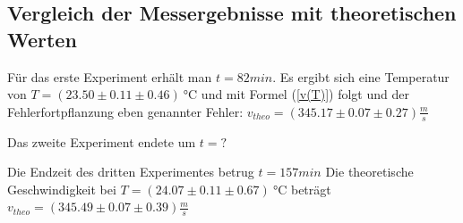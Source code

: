 \documentclass[]{article}
\begin{document}
	\subsection{Vergleich der Messergebnisse mit theoretischen Werten}

	Für das erste Experiment erhält man $t=82min$. Es ergibt sich eine Temperatur von $T=(23.50 \pm 0.11 \pm 0.46)\SI{}{\celsius}$ und mit Formel (\ref{v(T)}) folgt und der Fehlerfortpflanzung eben genannter Fehler: $v_{theo}=(345.17 \pm 0.07 \pm 0.27)\frac{m}{s}$

	Das zweite Experiment endete um $t=?$

	Die Endzeit des dritten Experimentes betrug $t=157min$
	Die theoretische Geschwindigkeit bei $T=(24.07 \pm 0.11 \pm 0.67)\SI{}{\celsius}$ beträgt $v_{theo}=(345.49 \pm 0.07 \pm 0.39)\frac{m}{s}$
	
	
	
\end{document}
